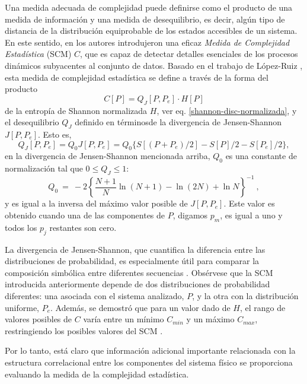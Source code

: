 Una medida adecuada de complejidad puede definirse como el producto de una medida de información y una medida de desequilibrio, es decir, algún tipo de distancia de la distribución equiprobable de los estados accesibles de un sistema.
En este sentido, en \cite{Lamberti2004} los autores introdujeron una eficaz {\it Medida de Complejidad Estadística \/} (SCM) $C$, que es capaz de detectar detalles esenciales de los procesos dinámicos subyacentes al conjunto de datos.
Basado en el trabajo de López-Ruiz \cite{Lopez1995}, esta medida de complejidad estadística \cite{Martin2003,Lamberti2004} se define a través de la forma del producto
\begin{equation}
C[P] = Q_{J}[P,P_e] \cdot H[P]
\label{complexity}
\end{equation}
de la entropía de Shannon normalizada $H$, ver eq. \eqref{shannon-disc-normalizada}, y el desequilibrio $Q_{J}$ definido en términosde la divergencia de Jensen-Shannon $J[P, P_e]$.
Esto es,
\begin{equation}
\label{disequilibrium}	
Q_{J} [ P, P_e] = Q_{0} J[ P, P_e] = Q_{0} \{ S[(P + P_e)/2 ] - S[ P ]/2 - S[P_e]/2\},
\end{equation}
en la divergencia de Jensen-Shannon mencionada arriba, $Q_0$ es una constante de normalización tal que $0 \leq Q_{J} \leq 1$:
\begin{equation}
Q_0 ~=~ -2 \left\{ {\frac{N+1}{N}} \ln (N+1) - \ln (2N) + \ln N \right\}^{-1} \ ,
\label{q0-jensen-1}
\end{equation}
y es igual a la inversa del máximo valor posible de $J [P,P_e]$.
Este valor es obtenido cuando una de las componentes de $P$, digamos $p_m$, es igual a uno y todos los $p_j$ restantes son cero.

La divergencia de Jensen-Shannon, que cuantifica la diferencia entre las distribuciones de probabilidad, es especialmente útil para comparar la composición simbólica entre diferentes secuencias \cite{Grosse2002}.
Obsérvese que la SCM introducida anteriormente depende de dos distribuciones de probabilidad diferentes: una asociada con el sistema analizado, $P$, y la otra con la distribución uniforme, $P_e$.
Además, se demostró que para un valor dado de $H$, el rango de valores posibles de $C$ varía entre un mínimo $C_ {min}$ y un máximo $C_ {max}$, restringiendo los posibles valores del SCM \cite{Martin2006}.

Por lo tanto, está claro que información adicional importante relacionada con la estructura correlacional entre los componentes del sistema físico se proporciona evaluando la medida de la complejidad estadística.

